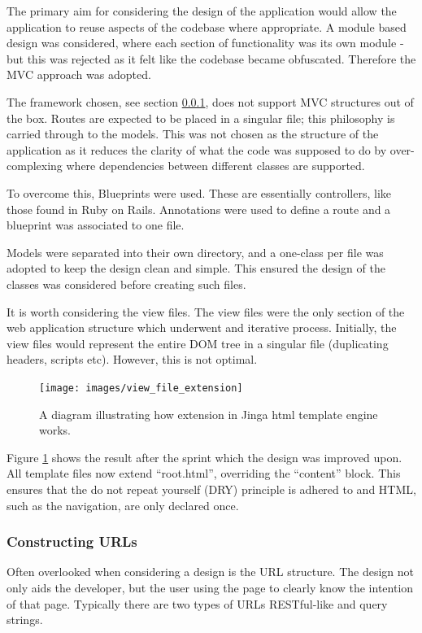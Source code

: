 The primary aim for considering the design of the application would allow the application to reuse aspects of the codebase where appropriate. A module based design was considered, where each section of functionality was its own module - but this was rejected as it felt like the codebase became obfuscated. Therefore the MVC approach was adopted.

The framework chosen, see section \ref{}, does not support MVC structures out of the box. Routes are expected to be placed in a singular file; this philosophy is carried through to the models. This was not chosen as the structure of the application as it reduces the clarity of what the code was supposed to do by over-complexing where dependencies between different classes are supported.

To overcome this, Blueprints were used. These are essentially controllers, like those found in Ruby on Rails. Annotations were used to define a route and a blueprint was associated to one file.

Models were separated into their own directory, and a one-class per file was adopted to keep the design clean and simple. This ensured the design of the classes was considered before creating such files.

It is worth considering the view files. The view files were the only section of the web application structure which underwent and iterative process. Initially, the view files would represent the entire DOM tree in a singular file (duplicating headers, scripts etc). However, this is not optimal.

\begin{figure}[H]
  \centering
  \texttt{[image: images/view\_file\_extension]}
  \caption{A diagram illustrating how extension in Jinga html template engine works.}
  \label{fig:extension}
\end{figure}

Figure \ref{fig:extension} shows the result after the sprint which the design was improved upon. All template files now extend ``root.html'', overriding the ``content'' block. This ensures that the do not repeat yourself (DRY) principle is adhered to and HTML, such as the navigation, are only declared once.

\subsubsection{Constructing URLs}
Often overlooked when considering a design is the URL structure. The design not only aids the developer, but the user using the page to clearly know the intention of that page. Typically there are two types of URLs RESTful-like and query strings.

